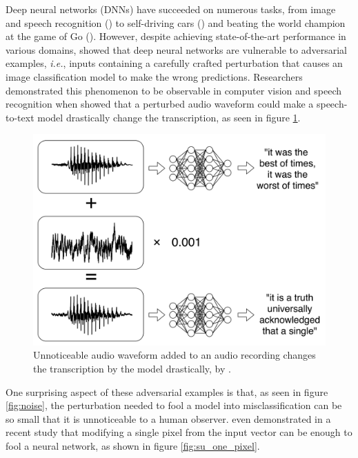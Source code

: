 \overridetextsize
Deep neural networks (DNNs) have succeeded on numerous tasks, from image and
speech recognition (\cite{russakovsky_imagenet_2015,amodei_deep_2015}) to
self-driving cars (\cite{bojarski_end_2016}) and beating the world champion at
the game of Go (\cite{silver_mastering_2016}). However, despite achieving
state-of-the-art performance in various domains, \cite{szegedy_intriguing_2014}
showed that deep neural networks are vulnerable to adversarial examples,
\emph{i.e.}, inputs containing a carefully crafted perturbation that causes an
image classification model to make the wrong predictions. Researchers
demonstrated this phenomenon to be observable in computer vision and speech
recognition when \cite{carlini_audio_2018} showed that a perturbed audio
waveform could make a speech-to-text model drastically change the transcription,
as seen in figure \ref{fig:carlini_audio}.
\begin{figure}[!htb]
    \centering
    \includegraphics[width=.6\linewidth]{Figures/intro/carlini_noise.png}
    \caption{ Unnoticeable audio waveform added to an audio recording changes
        the transcription by the model drastically, by
        \cite{carlini_audio_2018}.}
    \label{fig:carlini_audio}
\end{figure}

One surprising aspect of these adversarial examples is that, as seen in figure
\ref{fig:noise}, the perturbation needed to fool a model into misclassification
can be so small that it is unnoticeable to a human observer. \cite{su_one_2019}
even demonstrated in a recent study that modifying a single pixel from the input
vector can be enough to fool a neural network, as shown in figure
\ref{fig:su_one_pixel}.

